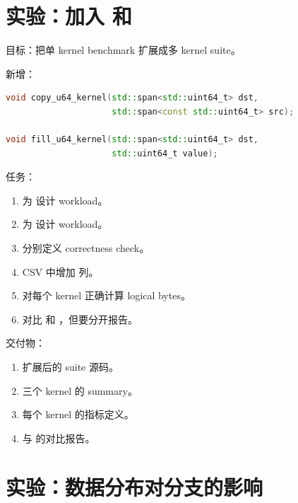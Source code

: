 \section{实验：加入  和 }

\begin{labbox}
目标：把单 kernel benchmark 扩展成多 kernel suite。

新增：

\begin{lstlisting}[language=C++]
void copy_u64_kernel(std::span<std::uint64_t> dst,
                     std::span<const std::uint64_t> src);

void fill_u64_kernel(std::span<std::uint64_t> dst,
                     std::uint64_t value);
\end{lstlisting}

任务：

\begin{enumerate}
  \item 为  设计 workload。
  \item 为  设计 workload。
  \item 分别定义 correctness check。
  \item CSV 中增加  列。
  \item 对每个 kernel 正确计算 logical bytes。
  \item 对比  和 ，但要分开报告。
\end{enumerate}

交付物：

\begin{enumerate}
  \item 扩展后的 suite 源码。
  \item 三个 kernel 的 summary。
  \item 每个 kernel 的指标定义。
  \item {} 与  的对比报告。
\end{enumerate}
\end{labbox}

\section{实验：数据分布对分支的影响}

